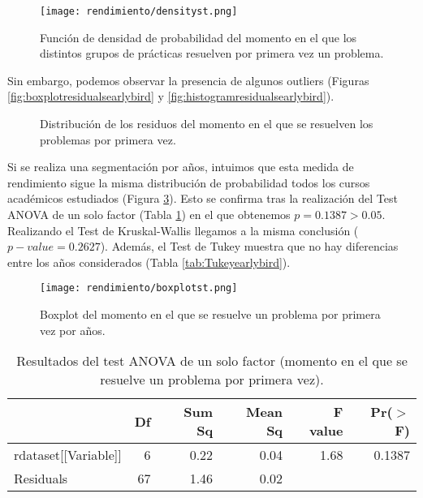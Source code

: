 \begin{figure}[H]
    \centering
    \texttt{[image: rendimiento/densityst.png]}
    \caption{Función de densidad de probabilidad del momento en el que los distintos grupos de prácticas resuelven por primera vez un problema.}
    \label{fig:densityplotearlybird}
\end{figure}

Sin embargo, podemos observar la presencia de algunos outliers (Figuras \ref{fig:boxplotresidualsearlybird} y \ref{fig:histogramresidualsearlybird}).

\begin{figure}[H]
\centering
{}\qquad
{}
\caption{Distribución de los residuos del momento en el que se resuelven los problemas por primera vez.}
\label{fig:earlybird}
\end{figure}

Si se realiza una segmentación por años, intuimos que esta medida de rendimiento sigue la misma distribución de probabilidad todos los cursos académicos estudiados (Figura \ref{fig:boxplotearlybird}). Esto se confirma tras la realización del Test ANOVA de un solo factor (Tabla \ref{tab:ANOVAearlybird}) en el que obtenemos $p = 0.1387 > 0.05$. Realizando el Test de Kruskal-Wallis llegamos a la misma conclusión ($p-value = 0.2627$). Además, el Test de Tukey muestra que no hay diferencias entre los años considerados (Tabla \ref{tab:Tukeyearlybird}).

\begin{figure}[H]
    \centering
    \texttt{[image: rendimiento/boxplotst.png]}
    \caption{Boxplot del momento en el que se resuelve un problema por primera vez por años.}
    \label{fig:boxplotearlybird}
\end{figure}

\begin{table}[H]
\centering
\caption{Resultados del test ANOVA de un solo factor (momento en el que se resuelve un problema por primera vez).}
\label{tab:ANOVAearlybird}
\begin{tabular}{lrrrrr}
  \hline
 & Df & Sum Sq & Mean Sq & F value & Pr($>$F) \\ 
  \hline
rdataset[[Variable]] & 6 & 0.22 & 0.04 & 1.68 & 0.1387 \\ 
  Residuals            & 67 & 1.46 & 0.02 &  &  \\ 
   \hline
\end{tabular}
\end{table}

